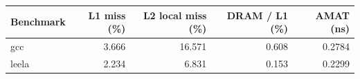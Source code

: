 \begin{tabular}{lrrrr}\toprule
Benchmark & L1 miss (\%) & L2 local miss (\%) & DRAM / L1 (\%) & AMAT (ns) \\ \midrule
gcc & 3.666 & 16.571 & 0.608 & 0.2784 \\
leela & 2.234 & 6.831 & 0.153 & 0.2299 \\
\bottomrule\end{tabular}

